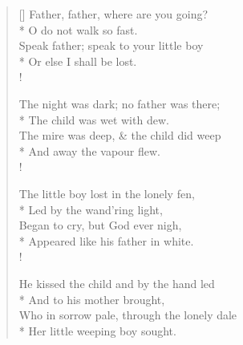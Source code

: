 \documentclass[MAIN]{subfiles}
\begin{document}
\settowidth{\versewidth}{Who in sorrow pale, through the lonely dale}
\begin{verse}[\versewidth]
Father, father, where are you going?\\*
\vin O do not walk so fast.\\
Speak father; speak to your little boy\\*
\vin Or else I shall be lost.\\!

The night was dark; no father was there;\\*
\vin The child was wet with dew.\\
The mire was deep, \& the child did weep\\*
\vin And away the vapour flew.\\!

The little boy lost in the lonely fen,\\*
\vin Led by the wand'ring light,\\
Began to cry, but God ever nigh,\\*
\vin Appeared like his father in white.\\!

He kissed the child and by the hand led\\*
\vin And to his mother brought,\\
Who in sorrow pale, through the lonely dale\\*
\vin Her little weeping boy sought.
\end{verse}
\end{document}

